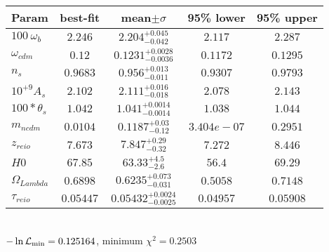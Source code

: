 \begin{tabular}{|l|c|c|c|c|} 
 \hline 
Param & best-fit & mean$\pm\sigma$ & 95\% lower & 95\% upper \\ \hline 
$100~\omega{}_{b }$ &$2.246$ & $2.204_{-0.042}^{+0.045}$ & $2.117$ & $2.287$ \\ 
$\omega{}_{cdm }$ &$0.12$ & $0.1231_{-0.0036}^{+0.0028}$ & $0.1172$ & $0.1295$ \\ 
$n_{s }$ &$0.9683$ & $0.956_{-0.011}^{+0.013}$ & $0.9307$ & $0.9793$ \\ 
$10^{+9}A_{s }$ &$2.102$ & $2.111_{-0.018}^{+0.016}$ & $2.078$ & $2.143$ \\ 
$100*\theta{}_{s }$ &$1.042$ & $1.041_{-0.0014}^{+0.0014}$ & $1.038$ & $1.044$ \\ 
$m_{ncdm }$ &$0.0104$ & $0.1187_{-0.12}^{+0.03}$ & $3.404e-07$ & $0.2951$ \\ 
$z_{reio }$ &$7.673$ & $7.847_{-0.32}^{+0.29}$ & $7.272$ & $8.446$ \\ 
$H0$ &$67.85$ & $63.33_{-2.6}^{+4.5}$ & $56.4$ & $69.29$ \\ 
$\Omega{}_{Lambda }$ &$0.6898$ & $0.6235_{-0.031}^{+0.073}$ & $0.5058$ & $0.7148$ \\ 
$\tau{}_{reio }$ &$0.05447$ & $0.05432_{-0.0025}^{+0.0024}$ & $0.04957$ & $0.05908$ \\ 
\hline 
 \end{tabular} \\ 
$-\ln{\cal L}_\mathrm{min} =0.125164$, minimum $\chi^2=0.2503$ \\ 
